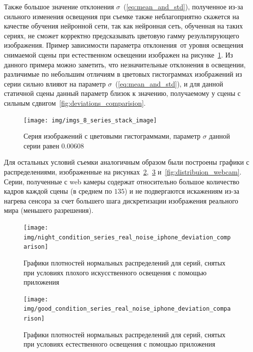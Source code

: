 Также большое значение отклонения $\sigma$~(\ref{eq:mean_and_std}), полученное из-за сильного изменения освещения при съемке также неблагоприятно скажется на качестве обучения нейронной сети, так как нейронная сеть, обученная на таких сериях, не сможет корректно предсказывать цветовую гамму результирующего изображения. Пример зависимости параметра отклонения от уровня освещения снимаемой сцены при естественном освещении изображен на рисунке~\ref{fig:hists_comparision}. Из данного примера  можно заметить, что незначительные отклонения в освещении, различимые по небольшим отличиям в цветовых гистограммах изображений из серии сильно влияют на параметр $\sigma$~(\ref{eq:mean_and_std}), и для данной статичной сцены данный параметр близок к значению, получаемому у сцены с сильным сдвигом~\ref{fig:deviations_comparision}.


\begin{figure}[H]
	\centering
	\texttt{[image: img/imgs\_8\_series\_stack\_image]}
	\caption{Серия изображений с цветовыми гистограммами, параметр $\sigma$ данной серии равен $0.00608$ }
	\label{fig:hists_comparision}
\end{figure}

Для остальных условий съемки аналогичным образом были построены графики с распределениями, изображенные на рисунках~\ref{fig:distribuion_real_noise},~\ref{fig:distribuion_real_noise_good_condition} и~\ref{fig:distribuion_webcam}. Серии, полученные с web камеры содержат относительно большое количество кадров каждой сцены (в среднем по $135$) и не подвергаются искажениям из-за нагрева сенсора за счет большего шага дискретизации изображения реального мира (меньшего разрешения).

\begin{figure}[H]
	\centering
	\texttt{[image: img/night\_condition\_series\_real\_noise\_iphone\_deviation\_comparison]}
	\caption{Графики плотностей нормальных распределений для серий, снятых при условиях плохого искусственного освещения с помощью приложения~\autocite{RAWCamera}}
	\label{fig:distribuion_real_noise}
\end{figure}


\begin{figure}[H]
	\centering
	\texttt{[image: img/good\_condition\_series\_real\_noise\_iphone\_deviation\_comparison]}
	\caption{Графики плотностей нормальных распределений для серий, снятых при условиях естественного освещения с помощью приложения~\autocite{RAWCamera}}
	\label{fig:distribuion_real_noise_good_condition}
\end{figure}

